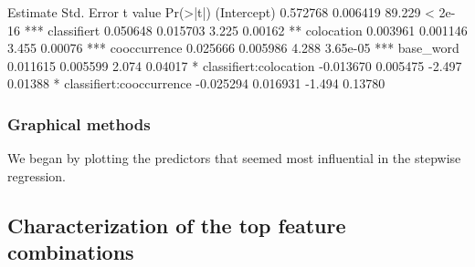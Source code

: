                          Estimate Std. Error t value Pr(>|t|)    
(Intercept)               0.572768   0.006419  89.229  < 2e-16 ***
classifiert               0.050648   0.015703   3.225  0.00162 ** 
colocation                0.003961   0.001146   3.455  0.00076 ***
cooccurrence              0.025666   0.005986   4.288 3.65e-05 ***
base_word                 0.011615   0.005599   2.074  0.04017 *  
classifiert:colocation   -0.013670   0.005475  -2.497  0.01388 *  
classifiert:cooccurrence -0.025294   0.016931  -1.494  0.13780  






\subsubsection{Graphical methods}
We began by plotting the predictors that seemed most influential in the
stepwise regression.







\subsection{Characterization of the top feature combinations}

